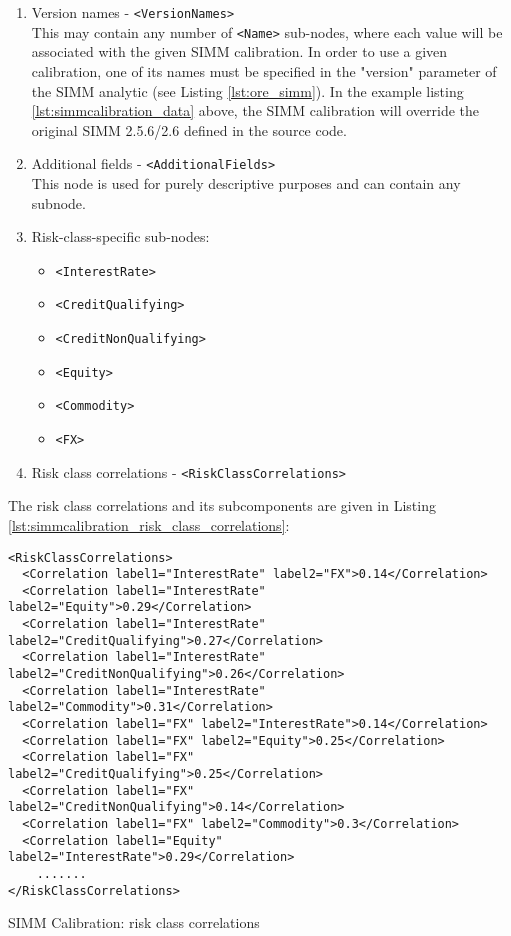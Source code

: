 \begin{enumerate}
  \item Version names - {\tt <VersionNames>} \\
    This may contain any number of {\tt <Name>} sub-nodes, where each value will be associated with the given SIMM
    calibration. In order to use a given calibration, one of its names must be specified in the "version" parameter of the
    SIMM analytic (see Listing \ref{lst:ore_simm}). In the example listing \ref{lst:simmcalibration_data} above, the SIMM
    calibration will override the original SIMM 2.5.6/2.6 defined in the source code.
  \item Additional fields - {\tt <AdditionalFields>} \\
    This node is used for purely descriptive purposes and can contain any subnode.
  \item Risk-class-specific sub-nodes:
    \begin{itemize}
      \item {\tt <InterestRate>}
      \item {\tt <CreditQualifying>}
      \item {\tt <CreditNonQualifying>}
      \item {\tt <Equity>}
      \item {\tt <Commodity>}
      \item {\tt <FX>}
    \end{itemize}
  \item Risk class correlations - {\tt <RiskClassCorrelations>}
\end{enumerate}

The risk class correlations and its subcomponents are given in Listing \ref{lst:simmcalibration_risk_class_correlations}:

\begin{listing}[H]
\begin{verbatim}
<RiskClassCorrelations>
  <Correlation label1="InterestRate" label2="FX">0.14</Correlation>
  <Correlation label1="InterestRate" label2="Equity">0.29</Correlation>
  <Correlation label1="InterestRate" label2="CreditQualifying">0.27</Correlation>
  <Correlation label1="InterestRate" label2="CreditNonQualifying">0.26</Correlation>
  <Correlation label1="InterestRate" label2="Commodity">0.31</Correlation>
  <Correlation label1="FX" label2="InterestRate">0.14</Correlation>
  <Correlation label1="FX" label2="Equity">0.25</Correlation>
  <Correlation label1="FX" label2="CreditQualifying">0.25</Correlation>
  <Correlation label1="FX" label2="CreditNonQualifying">0.14</Correlation>
  <Correlation label1="FX" label2="Commodity">0.3</Correlation>
  <Correlation label1="Equity" label2="InterestRate">0.29</Correlation>
    .......
</RiskClassCorrelations>
\end{verbatim}
\caption{SIMM Calibration: risk class correlations}
\label{lst:simmcalibration_risk_class_correlations}
\end{listing}

